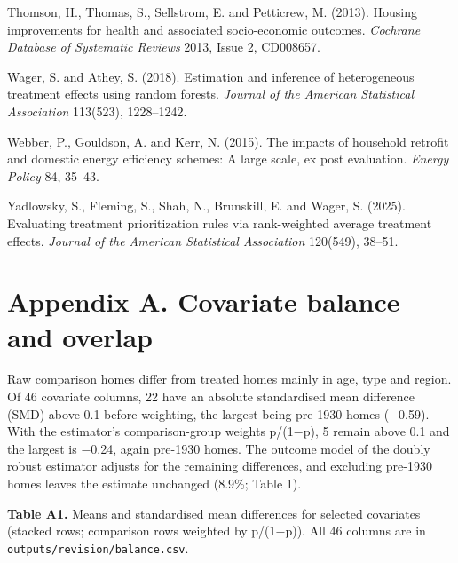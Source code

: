 \documentclass[11pt,a4paper]{article}
\begin{document}
\begin{list}{}{\setlength{\leftmargin}{1.5em}\setlength{\itemindent}{-1.5em}\setlength{\itemsep}{2pt}}
\item
  Thomson, H., Thomas, S., Sellstrom, E. and Petticrew, M. (2013). Housing improvements for health and associated socio-economic outcomes. \emph{Cochrane Database of Systematic Reviews} 2013, Issue 2, CD008657.
\item
  Wager, S. and Athey, S. (2018). Estimation and inference of heterogeneous treatment effects using random forests. \emph{Journal of the American Statistical Association} 113(523), 1228--1242.
\item
  Webber, P., Gouldson, A. and Kerr, N. (2015). The impacts of household retrofit and domestic energy efficiency schemes: A large scale, ex post evaluation. \emph{Energy Policy} 84, 35--43.
\item
  Yadlowsky, S., Fleming, S., Shah, N., Brunskill, E. and Wager, S. (2025). Evaluating treatment prioritization rules via rank-weighted average treatment effects. \emph{Journal of the American Statistical Association} 120(549), 38--51.
\end{list}

\section*{Appendix A. Covariate balance and overlap}

Raw comparison homes differ from treated homes mainly in age, type and region. Of 46 covariate columns, 22 have an absolute standardised mean difference (SMD) above 0.1 before weighting, the largest being pre-1930 homes (−0.59). With the estimator's comparison-group weights p/(1−p), 5 remain above 0.1 and the largest is −0.24, again pre-1930 homes. The outcome model of the doubly robust estimator adjusts for the remaining differences, and excluding pre-1930 homes leaves the estimate unchanged (8.9\%; Table 1).

\textbf{Table A1.} Means and standardised mean differences for selected covariates (stacked rows; comparison rows weighted by p/(1−p)). All 46 columns are in \texttt{outputs/revision/balance.csv}.
\end{document}
